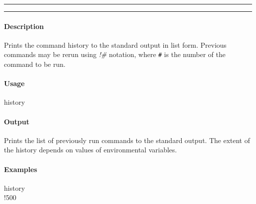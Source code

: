 \hrule
\vspace{1mm}
\hrule
\vspace{4mm}

\paragraph{Description}
\indentpar \raggedright \textrm{Prints the command history to the standard output in list form. Previous commands may be rerun using \textit{!\#} notation, where \texttt{\#} is the number of the command to be run.}\\

\paragraph{Usage}
\indentpar history \textit{}

\paragraph{Output}
\indentpar \textrm{Prints the list of previously run commands to the standard output. The extent of the history depends on values of environmental variables.}

\paragraph{Examples}

\indentpar history \\
\indentpar !500

\vspace{20mm}
